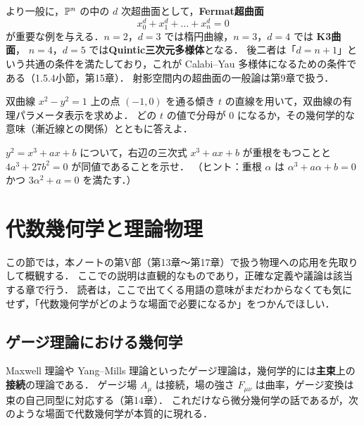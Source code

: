 より一般に，$\mathbb{P}^n$ の中の $d$ 次超曲面として，\textbf{Fermat超曲面}
\[
  x_0^d+x_1^d+\dots+x_n^d=0
\]
が重要な例を与える．$n=2$，$d=3$ では楕円曲線，$n=3$，$d=4$ では \textbf{K3曲面}，
$n=4$，$d=5$ では\textbf{Quintic三次元多様体}となる．
後二者は「$d=n+1$」という共通の条件を満たしており，これが Calabi--Yau 多様体になるための条件である（1.5.4小節，第15章）．
射影空間内の超曲面の一般論は第9章で扱う．

双曲線 $x^2-y^2=1$ 上の点 $(-1,0)$ を通る傾き $t$ の直線を用いて，双曲線の有理パラメータ表示を求めよ．
どの $t$ の値で分母が $0$ になるか，その幾何学的な意味（漸近線との関係）とともに答えよ．

$y^2=x^3+ax+b$ について，右辺の三次式 $x^3+ax+b$ が重根をもつことと $4a^3+27b^2=0$ が同値であることを示せ．
（ヒント：重根 $\alpha$ は $\alpha^3+a\alpha+b=0$ かつ $3\alpha^2+a=0$ を満たす．）

\section{代数幾何学と理論物理}

この節では，本ノートの第V部（第13章〜第17章）で扱う物理への応用を先取りして概観する．
ここでの説明は直観的なものであり，正確な定義や議論は該当する章で行う．
読者は，ここで出てくる用語の意味がまだわからなくても気にせず，「代数幾何学がどのような場面で必要になるか」をつかんでほしい．

\subsection{ゲージ理論における幾何学}

Maxwell 理論や Yang--Mills 理論といったゲージ理論は，幾何学的には\textbf{主束}上の\textbf{接続}の理論である．
ゲージ場 $A_\mu$ は接続，場の強さ $F_{\mu\nu}$ は曲率，ゲージ変換は束の自己同型に対応する（第14章）．
これだけなら微分幾何学の話であるが，次のような場面で代数幾何学が本質的に現れる．

